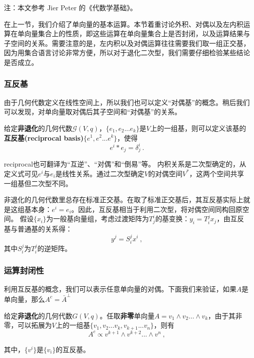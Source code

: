 

\begin{issues}
\issueTODO
\end{issues}
注：本文参考 Jier Peter 的《代数学基础》。

在上一节，我们介绍了单向量的基本运算。本节着重讨论外积、对偶以及左内积运算在单向量集合上的性质，即这些运算在单向量集合上是否封闭，以及运算结果与子空间的关系。需要注意的是，左内积以及对偶运算往往需要我们取一组正交基，因为用集合语言讨论非常方便，所以对于退化二次型，我们需要仔细检验某些结论是否成立。
\subsubsection{互反基}
由于几何代数定义在线性空间上，所以我们也可以定义“对偶基”的概念。稍后我们可以发现，对单向量取对偶后其子空间和“对偶基”的关系。

\begin{definition}{}
给定\textbf{非退化}的几何代数$\mathcal G(V,q)$，$\{e_1,e_2...e_k\}$是$V$上的一组基，则可以定义该基的\textbf{互反基(reciprocal basis)}$\{e^1,e^2...e^k\}$，使得
\begin{equation}
e^i*e_j=\delta^i_j~.
\end{equation}
\end{definition}
reciprocal也可翻译为“互逆”、“对偶”和“倒易”等。
内积关系是二次型确定的，从定义式可见$e^i$与$e_i$是线性关系。通过二次型确定$V$的对偶空间$V^*$，这两个空间共享一组基但二次型不同。

非退化的几何代数里总存在标准正交基。在取了标准正交基后，其互反基实际上就是这组基本身：$e^i=e_i$。因此，互反基相当于利用二次型，将对偶空间同构回原空间。
假设$\{x_i\}$为一般基向量组，考虑过渡矩阵为$T^i_j$的基变换：$y_i=T^j_ix_j$，由互反基与普通基的关系得：
\begin{equation}
y^j=S^j_ix^i~,
\end{equation}
其中$S^j_i$为$T^j_i$的逆矩阵。

\subsubsection{运算封闭性}
利用互反基的概念，我们可以表示任意单向量的对偶。下面我们来验证，如果$A$是单向量，那么$A^c=\bar A^{\perp}$
\begin{theorem}{}\label{the_Clf05_1}
给定\textbf{非退化}的几何代数$G(V,q)$。任取\textbf{非零}单向量$A=v_1\wedge v_2...\wedge v_k$，由于其非零，可以拓展为$V$上的一组基$\{v_1,v_2...v_k,v_{k+1}...v_n\}$，则有
\begin{equation}
A^c\propto v^{k+1}\wedge v^{k+2}...\wedge v^n~,
\end{equation}
\end{theorem}
其中，$\{v^i\}$是$\{v_i\}$的互反基。

